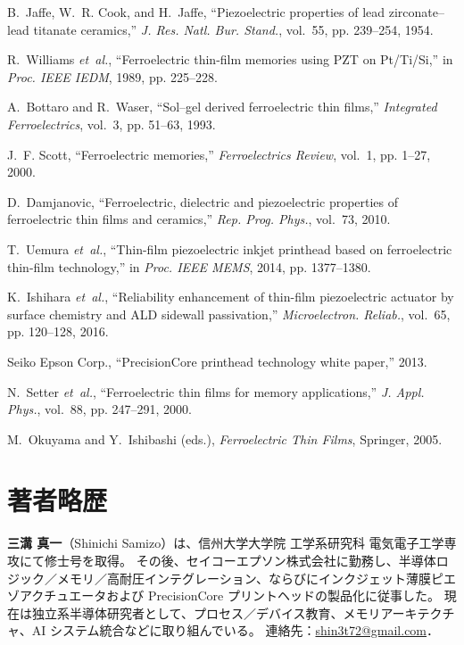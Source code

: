 \documentclass[conference]{IEEEtran}
\begin{document}
\begin{thebibliography}{10}

B.~Jaffe, W.~R. Cook, and H.~Jaffe, ``Piezoelectric properties of lead zirconate--lead titanate ceramics,'' \emph{J. Res. Natl. Bur. Stand.}, vol.~55, pp. 239--254, 1954.

R.~Williams \emph{et~al.}, ``Ferroelectric thin-film memories using PZT on Pt/Ti/Si,'' in \emph{Proc. IEEE IEDM}, 1989, pp. 225--228.

A.~Bottaro and R.~Waser, ``Sol--gel derived ferroelectric thin films,'' \emph{Integrated Ferroelectrics}, vol.~3, pp. 51--63, 1993.

J.~F. Scott, ``Ferroelectric memories,'' \emph{Ferroelectrics Review}, vol.~1, pp. 1--27, 2000.

D.~Damjanovic, ``Ferroelectric, dielectric and piezoelectric properties of ferroelectric thin films and ceramics,'' \emph{Rep. Prog. Phys.}, vol.~73, 2010.

T.~Uemura \emph{et~al.}, ``Thin-film piezoelectric inkjet printhead based on ferroelectric thin-film technology,'' in \emph{Proc. IEEE MEMS}, 2014, pp. 1377--1380.

K.~Ishihara \emph{et~al.}, ``Reliability enhancement of thin-film piezoelectric actuator by surface chemistry and ALD sidewall passivation,'' \emph{Microelectron. Reliab.}, vol.~65, pp. 120--128, 2016.

Seiko Epson Corp., ``PrecisionCore printhead technology white paper,'' 2013.

N.~Setter \emph{et~al.}, ``Ferroelectric thin films for memory applications,'' \emph{J. Appl. Phys.}, vol.~88, pp. 247--291, 2000.

M.~Okuyama and Y.~Ishibashi (eds.), \emph{Ferroelectric Thin Films}, Springer, 2005.

\end{thebibliography}

\section*{著者略歴}
\noindent\textbf{三溝 真一}（Shinichi Samizo）は、信州大学大学院 工学系研究科 電気電子工学専攻にて修士号を取得。
その後、セイコーエプソン株式会社に勤務し、半導体ロジック／メモリ／高耐圧インテグレーション、ならびにインクジェット薄膜ピエゾアクチュエータおよび PrecisionCore プリントヘッドの製品化に従事した。
現在は独立系半導体研究者として、プロセス／デバイス教育、メモリアーキテクチャ、AI システム統合などに取り組んでいる。
連絡先：\href{mailto:shin3t72@gmail.com}{shin3t72@gmail.com}．
\end{document}
